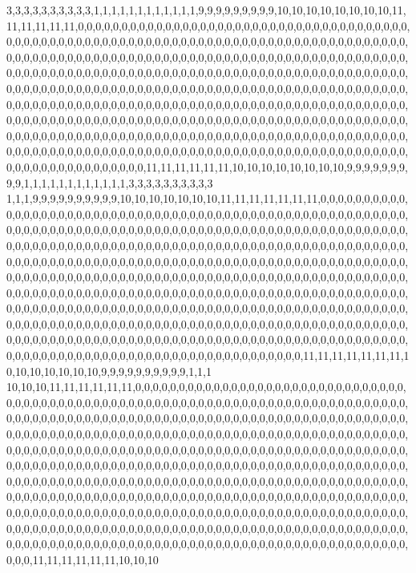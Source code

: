 3,3,3,3,3,3,3,3,3,3,1,1,1,1,1,1,1,1,1,1,1,1,9,9,9,9,9,9,9,9,9,10,10,10,10,10,10,10,10,11,11,11,11,11,11,0,0,0,0,0,0,0,0,0,0,0,0,0,0,0,0,0,0,0,0,0,0,0,0,0,0,0,0,0,0,0,0,0,0,0,0,0,0,0,0,0,0,0,0,0,0,0,0,0,0,0,0,0,0,0,0,0,0,0,0,0,0,0,0,0,0,0,0,0,0,0,0,0,0,0,0,0,0,0,0,0,0,0,0,0,0,0,0,0,0,0,0,0,0,0,0,0,0,0,0,0,0,0,0,0,0,0,0,0,0,0,0,0,0,0,0,0,0,0,0,0,0,0,0,0,0,0,0,0,0,0,0,0,0,0,0,0,0,0,0,0,0,0,0,0,0,0,0,0,0,0,0,0,0,0,0,0,0,0,0,0,0,0,0,0,0,0,0,0,0,0,0,0,0,0,0,0,0,0,0,0,0,0,0,0,0,0,0,0,0,0,0,0,0,0,0,0,0,0,0,0,0,0,0,0,0,0,0,0,0,0,0,0,0,0,0,0,0,0,0,0,0,0,0,0,0,0,0,0,0,0,0,0,0,0,0,0,0,0,0,0,0,0,0,0,0,0,0,0,0,0,0,0,0,0,0,0,0,0,0,0,0,0,0,0,0,0,0,0,0,0,0,0,0,0,0,0,0,0,0,0,0,0,0,0,0,0,0,0,0,0,0,0,0,0,0,0,0,0,0,0,0,0,0,0,0,0,0,0,0,0,0,0,0,0,0,0,0,0,0,0,0,0,0,0,0,0,0,0,0,0,0,0,0,0,0,0,0,0,0,0,0,0,0,0,0,0,0,0,0,0,0,0,0,0,0,0,0,0,0,0,0,0,0,0,0,0,0,0,0,0,0,0,0,0,0,0,0,0,0,0,0,0,0,0,0,0,0,0,0,0,0,0,0,0,0,0,0,0,0,0,0,0,0,0,0,0,0,0,0,0,0,0,0,0,0,0,0,0,0,0,0,11,11,11,11,11,11,10,10,10,10,10,10,10,10,9,9,9,9,9,9,9,9,9,1,1,1,1,1,1,1,1,1,1,1,1,3,3,3,3,3,3,3,3,3,3
1,1,1,9,9,9,9,9,9,9,9,9,9,10,10,10,10,10,10,10,11,11,11,11,11,11,11,0,0,0,0,0,0,0,0,0,0,0,0,0,0,0,0,0,0,0,0,0,0,0,0,0,0,0,0,0,0,0,0,0,0,0,0,0,0,0,0,0,0,0,0,0,0,0,0,0,0,0,0,0,0,0,0,0,0,0,0,0,0,0,0,0,0,0,0,0,0,0,0,0,0,0,0,0,0,0,0,0,0,0,0,0,0,0,0,0,0,0,0,0,0,0,0,0,0,0,0,0,0,0,0,0,0,0,0,0,0,0,0,0,0,0,0,0,0,0,0,0,0,0,0,0,0,0,0,0,0,0,0,0,0,0,0,0,0,0,0,0,0,0,0,0,0,0,0,0,0,0,0,0,0,0,0,0,0,0,0,0,0,0,0,0,0,0,0,0,0,0,0,0,0,0,0,0,0,0,0,0,0,0,0,0,0,0,0,0,0,0,0,0,0,0,0,0,0,0,0,0,0,0,0,0,0,0,0,0,0,0,0,0,0,0,0,0,0,0,0,0,0,0,0,0,0,0,0,0,0,0,0,0,0,0,0,0,0,0,0,0,0,0,0,0,0,0,0,0,0,0,0,0,0,0,0,0,0,0,0,0,0,0,0,0,0,0,0,0,0,0,0,0,0,0,0,0,0,0,0,0,0,0,0,0,0,0,0,0,0,0,0,0,0,0,0,0,0,0,0,0,0,0,0,0,0,0,0,0,0,0,0,0,0,0,0,0,0,0,0,0,0,0,0,0,0,0,0,0,0,0,0,0,0,0,0,0,0,0,0,0,0,0,0,0,0,0,0,0,0,0,0,0,0,0,0,0,0,0,0,0,0,0,0,0,0,0,0,0,0,0,0,0,0,0,0,0,0,0,0,0,0,0,0,0,0,0,0,0,0,0,0,0,0,0,0,0,0,0,0,0,0,0,0,0,0,0,0,0,0,0,0,0,0,0,0,0,0,0,0,0,0,0,0,0,0,0,0,0,0,0,0,0,0,0,0,0,0,0,0,0,0,0,0,0,0,0,0,0,0,0,0,0,0,0,0,0,0,11,11,11,11,11,11,11,10,10,10,10,10,10,10,9,9,9,9,9,9,9,9,9,9,1,1,1
10,10,10,11,11,11,11,11,11,0,0,0,0,0,0,0,0,0,0,0,0,0,0,0,0,0,0,0,0,0,0,0,0,0,0,0,0,0,0,0,0,0,0,0,0,0,0,0,0,0,0,0,0,0,0,0,0,0,0,0,0,0,0,0,0,0,0,0,0,0,0,0,0,0,0,0,0,0,0,0,0,0,0,0,0,0,0,0,0,0,0,0,0,0,0,0,0,0,0,0,0,0,0,0,0,0,0,0,0,0,0,0,0,0,0,0,0,0,0,0,0,0,0,0,0,0,0,0,0,0,0,0,0,0,0,0,0,0,0,0,0,0,0,0,0,0,0,0,0,0,0,0,0,0,0,0,0,0,0,0,0,0,0,0,0,0,0,0,0,0,0,0,0,0,0,0,0,0,0,0,0,0,0,0,0,0,0,0,0,0,0,0,0,0,0,0,0,0,0,0,0,0,0,0,0,0,0,0,0,0,0,0,0,0,0,0,0,0,0,0,0,0,0,0,0,0,0,0,0,0,0,0,0,0,0,0,0,0,0,0,0,0,0,0,0,0,0,0,0,0,0,0,0,0,0,0,0,0,0,0,0,0,0,0,0,0,0,0,0,0,0,0,0,0,0,0,0,0,0,0,0,0,0,0,0,0,0,0,0,0,0,0,0,0,0,0,0,0,0,0,0,0,0,0,0,0,0,0,0,0,0,0,0,0,0,0,0,0,0,0,0,0,0,0,0,0,0,0,0,0,0,0,0,0,0,0,0,0,0,0,0,0,0,0,0,0,0,0,0,0,0,0,0,0,0,0,0,0,0,0,0,0,0,0,0,0,0,0,0,0,0,0,0,0,0,0,0,0,0,0,0,0,0,0,0,0,0,0,0,0,0,0,0,0,0,0,0,0,0,0,0,0,0,0,0,0,0,0,0,0,0,0,0,0,0,0,0,0,0,0,0,0,0,0,0,0,0,0,0,0,0,0,0,0,0,0,0,0,0,0,0,0,0,0,0,0,0,0,0,0,0,0,0,0,0,0,0,0,0,0,0,0,0,0,0,0,0,0,0,0,0,0,0,0,0,0,0,0,0,0,0,0,0,0,0,0,0,0,0,0,0,0,0,0,0,0,0,0,0,0,0,0,0,11,11,11,11,11,11,10,10,10
